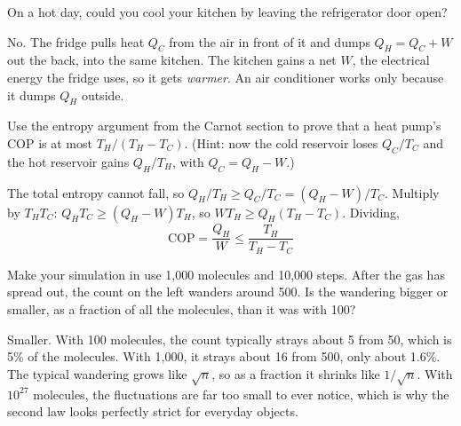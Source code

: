\begin{Exercise}[title={Open the Fridge}, label=sl_fridge]
On a hot day, could you cool your kitchen by leaving the refrigerator door open?
\end{Exercise}
\begin{Answer}[ref=sl_fridge]
No. The fridge pulls heat $Q_C$ from the air in front of it and dumps $Q_H = Q_C + W$ out the back, into
the same kitchen. The kitchen gains a net $W$, the electrical energy the fridge uses, so it gets
\emph{warmer}. An air conditioner works only because it dumps $Q_H$ outside.
\end{Answer}

\begin{Exercise}[title={Proving the Heat Pump Limit}, label=sl_cop]
Use the entropy argument from the Carnot section to prove that a heat pump's COP is at most
$T_H/(T_H - T_C)$. (Hint: now the cold reservoir loses $Q_C/T_C$ and the hot reservoir gains $Q_H/T_H$,
with $Q_C = Q_H - W$.)
\end{Exercise}
\begin{Answer}[ref=sl_cop]
The total entropy cannot fall, so $Q_H/T_H \geq Q_C/T_C = (Q_H - W)/T_C$. Multiply by $T_H T_C$:
$Q_H T_C \geq (Q_H - W) T_H$, so $W T_H \geq Q_H (T_H - T_C)$. Dividing,
$$\text{COP} = \frac{Q_H}{W} \leq \frac{T_H}{T_H - T_C}$$
\end{Answer}

\begin{Exercise}[title={More Molecules}, label=sl_more]
Make your simulation in  use 1,000 molecules and 10,000 steps. After the gas has spread out,
the count on the left wanders around 500. Is the wandering bigger or smaller, as a fraction of all the
molecules, than it was with 100?
\end{Exercise}
\begin{Answer}[ref=sl_more]
Smaller. With 100 molecules, the count typically strays about 5 from 50, which is 5\% of the molecules.
With 1,000, it strays about 16 from 500, only about 1.6\%. The typical wandering grows like $\sqrt{n}$,
so as a fraction it shrinks like $1/\sqrt{n}$. With $10^{27}$ molecules, the fluctuations are far too
small to ever notice, which is why the second law looks perfectly strict for everyday objects.
\end{Answer}
